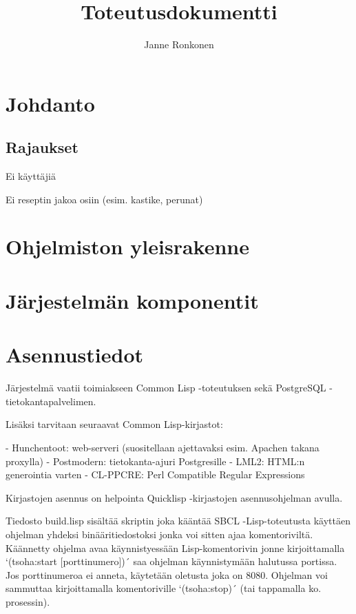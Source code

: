 \documentclass[12pt]{article}
\begin{document}
\begin{titlepage}
\title{Toteutusdokumentti}
\author{Janne Ronkonen}
\maketitle
\end{titlepage}

\tableofcontents

\section{Johdanto}


\subsection{Rajaukset}

Ei käyttäjiä

Ei reseptin jakoa osiin (esim. kastike, perunat)

\section{Ohjelmiston yleisrakenne}

\section{Järjestelmän komponentit}

\section{Asennustiedot}


Järjestelmä vaatii toimiakseen Common Lisp -toteutuksen sekä PostgreSQL -tietokantapalvelimen. 


Lisäksi tarvitaan seuraavat Common Lisp-kirjastot:

- Hunchentoot: web-serveri (suositellaan ajettavaksi esim. Apachen takana proxylla)
- Postmodern: tietokanta-ajuri Postgresille
- LML2: HTML:n generointia varten
- CL-PPCRE: Perl Compatible Regular Expressions

Kirjastojen asennus on helpointa Quicklisp -kirjastojen asennusohjelman avulla.

Tiedosto build.lisp sisältää skriptin joka kääntää SBCL -Lisp-toteutusta käyttäen ohjelman
yhdeksi binääritiedostoksi jonka voi sitten ajaa komentoriviltä. Käännetty ohjelma avaa
käynnistyessään Lisp-komentorivin jonne kirjoittamalla `(tsoha:start [porttinumero])´ saa ohjelman
käynnistymään halutussa portissa. Jos porttinumeroa ei anneta, käytetään oletusta joka on 8080.
Ohjelman voi sammuttaa kirjoittamalla komentoriville `(tsoha:stop)´ (tai tappamalla ko. prosessin).
\end{document}
